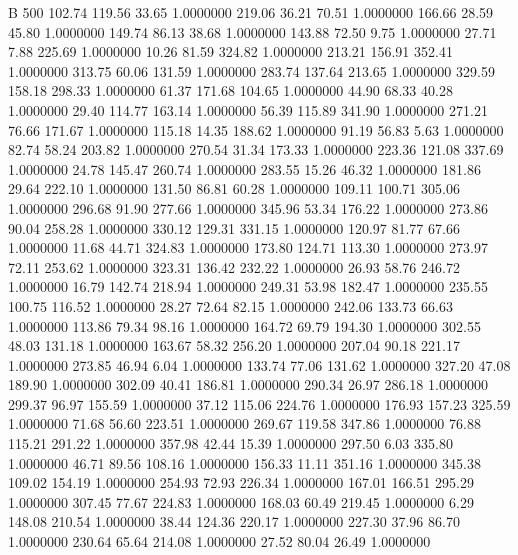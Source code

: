 


B 500
 102.74  119.56   33.65   1.0000000
 219.06   36.21   70.51   1.0000000
 166.66   28.59   45.80   1.0000000
 149.74   86.13   38.68   1.0000000
 143.88   72.50    9.75   1.0000000
  27.71    7.88  225.69   1.0000000
  10.26   81.59  324.82   1.0000000
 213.21  156.91  352.41   1.0000000
 313.75   60.06  131.59   1.0000000
 283.74  137.64  213.65   1.0000000
 329.59  158.18  298.33   1.0000000
  61.37  171.68  104.65   1.0000000
  44.90   68.33   40.28   1.0000000
  29.40  114.77  163.14   1.0000000
  56.39  115.89  341.90   1.0000000
 271.21   76.66  171.67   1.0000000
 115.18   14.35  188.62   1.0000000
  91.19   56.83    5.63   1.0000000
  82.74   58.24  203.82   1.0000000
 270.54   31.34  173.33   1.0000000
 223.36  121.08  337.69   1.0000000
  24.78  145.47  260.74   1.0000000
 283.55   15.26   46.32   1.0000000
 181.86   29.64  222.10   1.0000000
 131.50   86.81   60.28   1.0000000
 109.11  100.71  305.06   1.0000000
 296.68   91.90  277.66   1.0000000
 345.96   53.34  176.22   1.0000000
 273.86   90.04  258.28   1.0000000
 330.12  129.31  331.15   1.0000000
 120.97   81.77   67.66   1.0000000
  11.68   44.71  324.83   1.0000000
 173.80  124.71  113.30   1.0000000
 273.97   72.11  253.62   1.0000000
 323.31  136.42  232.22   1.0000000
  26.93   58.76  246.72   1.0000000
  16.79  142.74  218.94   1.0000000
 249.31   53.98  182.47   1.0000000
 235.55  100.75  116.52   1.0000000
  28.27   72.64   82.15   1.0000000
 242.06  133.73   66.63   1.0000000
 113.86   79.34   98.16   1.0000000
 164.72   69.79  194.30   1.0000000
 302.55   48.03  131.18   1.0000000
 163.67   58.32  256.20   1.0000000
 207.04   90.18  221.17   1.0000000
 273.85   46.94    6.04   1.0000000
 133.74   77.06  131.62   1.0000000
 327.20   47.08  189.90   1.0000000
 302.09   40.41  186.81   1.0000000
 290.34   26.97  286.18   1.0000000
 299.37   96.97  155.59   1.0000000
  37.12  115.06  224.76   1.0000000
 176.93  157.23  325.59   1.0000000
  71.68   56.60  223.51   1.0000000
 269.67  119.58  347.86   1.0000000
  76.88  115.21  291.22   1.0000000
 357.98   42.44   15.39   1.0000000
 297.50    6.03  335.80   1.0000000
  46.71   89.56  108.16   1.0000000
 156.33   11.11  351.16   1.0000000
 345.38  109.02  154.19   1.0000000
 254.93   72.93  226.34   1.0000000
 167.01  166.51  295.29   1.0000000
 307.45   77.67  224.83   1.0000000
 168.03   60.49  219.45   1.0000000
   6.29  148.08  210.54   1.0000000
  38.44  124.36  220.17   1.0000000
 227.30   37.96   86.70   1.0000000
 230.64   65.64  214.08   1.0000000
  27.52   80.04   26.49   1.0000000
